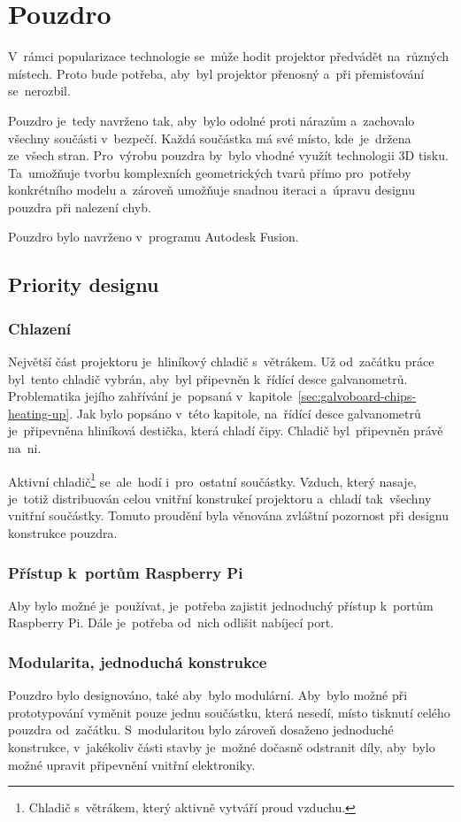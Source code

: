 \section{Pouzdro}

V~rámci popularizace technologie se~může hodit projektor předvádět na~různých místech. Proto bude potřeba, aby~byl projektor přenosný a~při přemisťování se~nerozbil.

Pouzdro je~tedy navrženo tak, aby~bylo odolné proti nárazům a~zachovalo všechny součásti v~bezpečí. Každá součástka má své místo, kde~je~držena ze~všech stran. Pro~výrobu pouzdra by~bylo vhodné využít technologii 3D tisku. Ta~umožňuje tvorbu komplexních geometrických tvarů přímo pro~potřeby konkrétního modelu a~zároveň umožňuje snadnou iteraci a~úpravu designu pouzdra při nalezení chyb.

Pouzdro bylo navrženo v~programu Autodesk Fusion.

\subsection{Priority designu} \label{sec:krabick-design-priorities}
\subsubsection{Chlazení}
Největší část projektoru je~hliníkový chladič s~větrákem. Už od~začátku práce byl~tento chladič vybrán, aby~byl připevněn k~řídící desce galvanometrů. Problematika jejího zahřívání je~popsaná v~kapitole~\ref{sec:galvoboard-chips-heating-up}.
Jak bylo popsáno v~této kapitole, na~řídící desce galvanometrů je~připevněna hliníková destička, která chladí čipy. Chladič byl~připevněn právě na~ni.

Aktivní chladič\footnote{Chladič s~větrákem, který aktivně vytváří proud vzduchu.} se~ale~hodí i~pro~ostatní součástky. Vzduch, který nasaje, je~totiž distribuován celou vnitřní konstrukcí projektoru a~chladí tak~všechny vnitřní součástky. Tomuto proudění byla věnována zvláštní pozornost při designu konstrukce pouzdra.

\subsubsection{Přístup k~portům Raspberry Pi}
Aby bylo možné je~používat, je~potřeba zajistit jednoduchý přístup k~portům Raspberry Pi. Dále je~potřeba od~nich odlišit nabíjecí port.

\subsubsection{Modularita, jednoduchá konstrukce}
Pouzdro bylo designováno, také aby~bylo modulární. Aby~bylo možné při prototypování vyměnit pouze jednu součástku, která nesedí, místo tisknutí celého pouzdra od~začátku. S~modularitou bylo zároveň dosaženo jednoduché konstrukce, v~jakékoliv části stavby je~možné dočasně odstranit díly, aby~bylo možné upravit připevnění vnitřní elektroniky.

